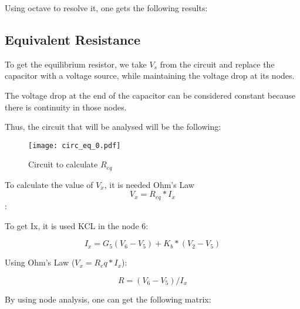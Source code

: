 Using octave to resolve it, one gets the following results:

\vspace{0.5cm}






\subsection{Equivalent Resistance}

To get the equilibrium resistor, we take $V_s$ from the circuit and replace the capacitor with a voltage source, while maintaining the voltage drop at its nodes.

The voltage drop at the end of the capacitor can be considered constant because there is continuity in those nodes.

Thus, the circuit that will be analysed will be the following:


\begin{figure}[h!]
   \texttt{[image: circ\_eq\_0.pdf]}
    \centering
    \caption{Circuit to calculate $R_{eq}$} 
    \label{Req}
\end{figure}


To calculate the value of $V_x$, it is needed Ohm's Law $$ V_x = R_{eq}*I_x$$:

To get Ix, it is used KCL in the node 6:

$$I_x = G_5(V_6-V_5) + K_b*(V_2-V_5)$$

Using Ohm's Law ($ V_x = R_eq*I_x$):

$$R = (V_6 - V_5)/I_x$$



By using node analysis, one can get the following matrix:

